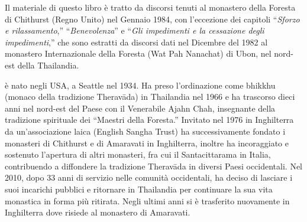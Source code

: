 
{\centering\par
\Large\scshape\chapTitleFont\thetitle
\par}
\vspace*{2\baselineskip}

{%
\setlength{\parskip}{1.5em}
\setlength{\parindent}{0pt}

Il materiale di questo libro è tratto da discorsi tenuti al monastero della Foresta di Chithurst (Regno Unito) nel Gennaio 1984, con l'eccezione dei capitoli ``\textit{Sforzo e rilassamento},'' ``\textit{Benevolenza}'' e ``\textit{Gli impedimenti e la cessazione degli impedimenti},'' che sono estratti da discorsi dati nel Dicembre del 1982 al monastero Internazionale della Foresta (Wat Pah Nanachat) di Ubon, nel nord-est della Thailandia.

%
%
%
%
%
%
%

\clearpage
\thispagestyle{empty}
{\setlength{\parskip}{0.8em}
{\scshape \theauthor} è nato negli USA, a Seattle nel 1934. Ha preso l'ordinazione come bhikkhu (monaco della tradizione Theravāda) in Thailandia nel 1966 e ha trascorso dieci anni nel nord-est del Paese con il Venerabile Ajahn Chah, insegnante della tradizione spirituale dei ``Maestri della Foresta.'' Invitato nel 1976 in Inghilterra da un'associazione laica (English Sangha Trust) ha successivamente fondato i monasteri di Chithurst e di Amaravati in Inghilterra, inoltre ha incoraggiato e sostenuto l'apertura di altri monasteri, fra cui il Santacittarama in Italia, contribuendo a diffondere la tradizione Theravāda in diversi Paesi occidentali. Nel 2010, dopo 33 anni di servizio nelle comunità occidentali, ha deciso di lasciare i suoi incarichi pubblici e ritornare in Thailandia per continuare la sua vita monastica in forma più ritirata. Negli ultimi anni si è trasferito nuovamente in Inghilterra dove risiede al monastero di Amaravati.
\enlargethispage*{1\baselineskip}

}}
